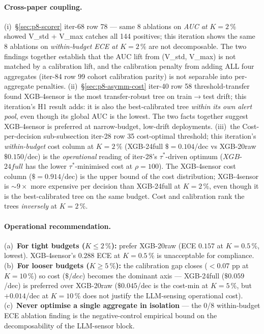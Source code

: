 \documentclass{article}
\begin{document}
\paragraph{Cross-paper coupling.}
(i)~\S\ref{sec:p8-scorer} iter-68 row 78 --- same 8 ablations on
\emph{AUC at $K{=}2\,\%$} showed V\_std + V\_max catches all 144
positives; this iteration shows the same 8 ablations on
\emph{within-budget ECE at $K{=}2\,\%$} are not decomposable. The
two findings together establish that the AUC lift from
(V\_std, V\_max) is not matched by a calibration lift, and the
calibration penalty from adding ALL four aggregates (iter-84 row
99 cohort calibration parity) is not separable into per-aggregate
penalties. (ii)~\S\ref{sec:p8-asymm-cost} iter-40 row
58 threshold-transfer found XGB-4sensor is the most
transfer-robust tree on train$\to$test drift; this iteration's H1
result adds: it is also the best-calibrated tree \emph{within its
own alert pool}, even though its global AUC is the lowest. The
two facts together suggest XGB-4sensor is preferred at
narrow-budget, low-drift deployments. (iii)~the Cost-per-decision
sub-subsection iter-28 row 35 cost-optimal threshold; this iteration's
\emph{within-budget} cost column at $K{=}2\,\%$ (XGB-24full
$\${=}0.104$/dec vs XGB-20raw $\$0.150$/dec) is the
\emph{operational} reading of iter-28's $\tau^*$-driven optimum
($XGB$-$24full$ has the lower $\tau^*$-minimised cost at
$\rho{=}100$). The XGB-4sensor cost column ($\${=}0.914$/dec) is
the upper bound of the cost distribution; XGB-4sensor is $\sim\!9\times$
more expensive per decision than XGB-24full at $K{=}2\,\%$, even
though it is the best-calibrated tree on the same budget. Cost
and calibration rank the trees \emph{inversely} at $K{=}2\,\%$.

\paragraph{Operational recommendation.}
(a)~\textbf{For tight budgets ($K \leq 2\,\%$):} prefer XGB-20raw
(ECE $0.157$ at $K{=}0.5\,\%$, lowest). XGB-4sensor's $0.288$ ECE
at $K{=}0.5\,\%$ is unacceptable for compliance. (b)~\textbf{For
looser budgets ($K \geq 5\,\%$):} the calibration gap closes
($<0.07$ pp at $K{=}10\,\%$) so cost ($\$/dec$) becomes the
dominant axis --- XGB-24full ($\$0.059$/dec) is preferred over
XGB-20raw ($\$0.045$/dec is the cost-min at $K{=}5\,\%$, but
$+0.014$/dec at $K{=}10\,\%$ does not justify the LLM-sensing
operational cost). (c)~\textbf{Never optimise a single
aggregate in isolation} --- the 0/8 within-budget ECE ablation
finding is the negative-control empirical bound on the
decomposability of the LLM-sensor block.
\end{document}
